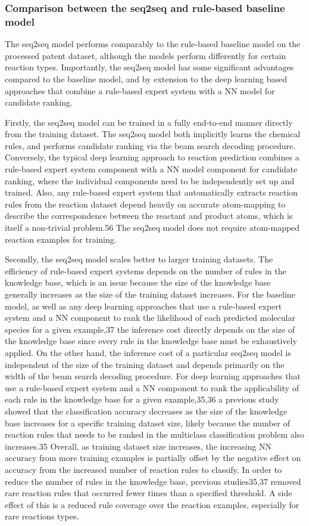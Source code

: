 \subsubsection{Comparison between the seq2seq and rule-based baseline model}

The seq2seq model performs comparably to the rule-based baseline model on the processed patent dataset, although the models perform differently for certain reaction types. Importantly, the seq2seq model has some significant advantages compared to the baseline model, and by extension to the deep learning based approaches that combine a rule-based expert system with a NN model for candidate ranking.

Firstly, the seq2seq model can be trained in a fully end-to-end manner directly from the training dataset. The seq2seq model both implicitly learns the chemical rules, and performs candidate ranking via the beam search decoding procedure. Conversely, the typical deep learning approach to reaction prediction combines a rule-based expert system component with a NN model component for candidate ranking, where the individual components need to be independently set up and trained. Also, any rule-based expert system that automatically extracts reaction rules from the reaction dataset depend heavily on accurate atom-mapping to describe the correspondence between the reactant and product atoms, which is itself a non-trivial problem.56 The seq2seq model does not require atom-mapped reaction examples for training. 

Secondly, the seq2seq model scales better to larger training datasets. The efficiency of rule-based expert systems depends on the number of rules in the knowledge base, which is an issue because the size of the knowledge base generally increases as the size of the training dataset increases. For the baseline model, as well as any deep learning approaches that use a rule-based expert system and a NN component to rank the likelihood of each predicted molecular species for a given example,37 the inference cost directly depends on the size of the knowledge base since every rule in the knowledge base must be exhaustively applied. On the other hand, the inference cost of a particular seq2seq model is independent of the size of the training dataset and depends primarily on the width of the beam search decoding procedure. For deep learning approaches that use a rule-based expert system and a NN component to rank the applicability of each rule in the knowledge base for a given example,35,36 a previous study showed that the classification accuracy decreases as the size of the knowledge base increases for a specific training dataset size, likely because the number of reaction rules that needs to be ranked in the multiclass classification problem also increases.35 Overall, as training dataset size increases, the increasing NN accuracy from more training examples is partially offset by the negative effect on accuracy from the increased number of reaction rules to classify. In order to reduce the number of rules in the knowledge base, previous studies35,37 removed rare reaction rules that occurred fewer times than a specified threshold. A side effect of this is a reduced rule coverage over the reaction examples, especially for rare reactions types. 


